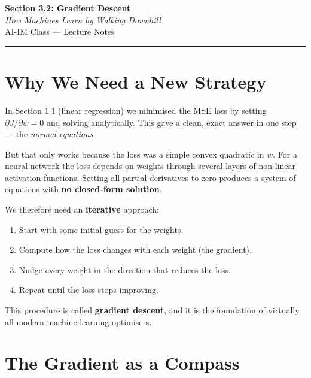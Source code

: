 \documentclass[12pt, a4paper]{article}
\begin{document}
\begin{center}
  {\LARGE \textbf{Section 3.2: Gradient Descent}} \\[0.3em]
  {\large\itshape How Machines Learn by Walking Downhill} \\[0.5em]
  {\large AI-IM Class --- Lecture Notes}%
  \ifstudentmode
  \fi
\end{center}

\vspace{1em}
\hrule
\vspace{1.5em}

\section{Why We Need a New Strategy}

In Section 1.1 (linear regression) we minimised the MSE loss by setting
$\partial J/\partial w = 0$ and solving analytically.  This gave a clean,
exact answer in one step --- the \emph{normal equations}.

But that only works because the loss was a simple convex quadratic in $w$.
For a neural network the loss depends on weights through several layers of
non-linear activation functions.  Setting all partial derivatives to zero
produces a system of equations with \textbf{no closed-form solution}.

We therefore need an \textbf{iterative} approach:
\begin{enumerate}[nosep]
  \item Start with some initial guess for the weights.
  \item Compute how the loss changes with each weight (the gradient).
  \item Nudge every weight in the direction that reduces the loss.
  \item Repeat until the loss stops improving.
\end{enumerate}

This procedure is called \textbf{gradient descent}, and it is the foundation
of virtually all modern machine-learning optimisers.

\section{The Gradient as a Compass}
\end{document}
